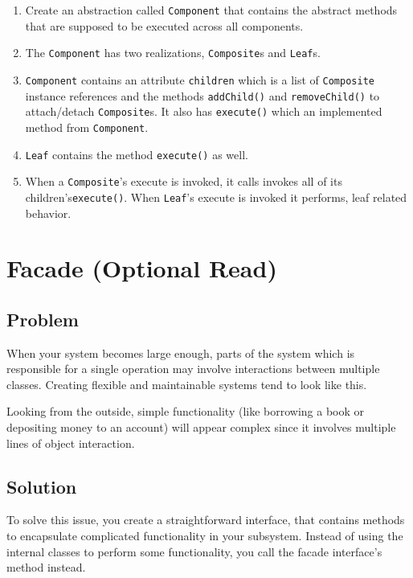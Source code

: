 \begin{enumerate}
\def\labelenumi{\arabic{enumi}.}
\tightlist
\item
  Create an abstraction called \texttt{Component} that contains the
  abstract methods that are supposed to be executed across all
  components.
\item
  The \texttt{Component} has two realizations, \texttt{Composite}s and
  \texttt{Leaf}s.
\item
  \texttt{Component} contains an attribute \texttt{children} which is a
  list of \texttt{Composite} instance references and the methods
  \texttt{addChild()} and \texttt{removeChild()} to attach/detach
  \texttt{Composite}s. It also has \texttt{execute()} which an
  implemented method from \texttt{Component}.
\item
  \texttt{Leaf} contains the method \texttt{execute()} as well.
\item
  When a \texttt{Composite}'s execute is invoked, it calls invokes all
  of its children's\texttt{execute()}. When \texttt{Leaf}'s execute is
  invoked it performs, leaf related behavior.
\end{enumerate}

\section{Facade (Optional
Read)}\label{structural-patterns.md__facade-optional-read}

\subsection{Problem}\label{structural-patterns.md__problem-3}

When your system becomes large enough, parts of the system which is
responsible for a single operation may involve interactions between
multiple classes. Creating flexible and maintainable systems tend to
look like this.

Looking from the outside, simple functionality (like borrowing a book or
depositing money to an account) will appear complex since it involves
multiple lines of object interaction.

\subsection{Solution}\label{structural-patterns.md__solution-3}

To solve this issue, you create a straightforward interface, that
contains methods to encapsulate complicated functionality in your
subsystem. Instead of using the internal classes to perform some
functionality, you call the facade interface's method instead.


